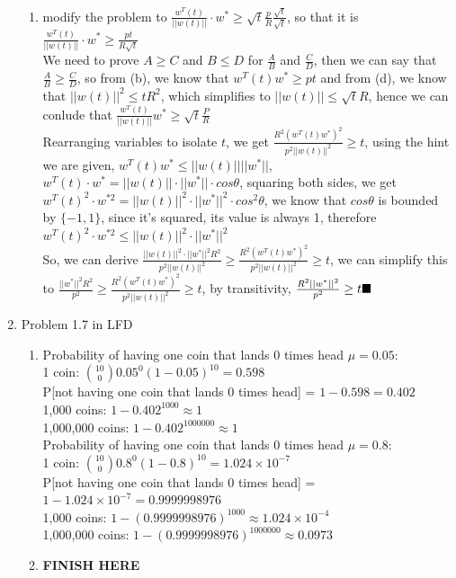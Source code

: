 \documentclass{article}
\begin{document}
\begin{enumerate}
\begin{enumerate}[label=(\alph*)]
            \item modify the problem to $\frac{w^T(t)}{||w(t)||} \cdot w^* \geq \sqrt{t} \frac{p}{R} \frac{\sqrt{t}}{\sqrt{t}}$, so that it is $\frac{w^T(t)}{||w(t)||} \cdot w^* \geq \frac{pt}{R\sqrt{t}}$ \\[0.25in]
            We need to prove $A \geq C$ and $B \leq D$ for $\frac{A}{B}$ and $\frac{C}{D}$, then we can say that $\frac{A}{B} \geq \frac{C}{D}$, so from (b), we know that $w^T(t)w^* \geq pt$ and from (d), we know that $||w(t)||^2 \leq tR^2$, which simplifies to $||w(t)|| \leq \sqrt{t}R$, hence we can conlude that $\frac{w^T(t)}{||w(t)||}w^* \geq \sqrt{t} \frac{P}{R}$\\[0.25in]
            Rearranging variables to isolate $t$, we get $\frac{R^2(w^T(t)w^*)^2}{p^2||w(t)||^2} \geq t$, using the hint we are given, $w^T(t)w^* \leq ||w(t)|| ||w^*||$, $w^T(t) \cdot w^* = ||w(t)|| \cdot ||w^*|| \cdot cos \theta$, squaring both sides, we get $w^T(t)^2 \cdot w^{*2} = ||w(t)||^2 \cdot ||w^*||^2 \cdot cos^2\theta$, we know that $cos\theta$ is bounded by $\{-1, 1\}$, since it's squared, its value is always 1, therefore $w^T(t)^2 \cdot w^{*2} \leq ||w(t)||^2 \cdot ||w^*||^2$\\[0.25in]
            So, we can derive $\frac{||w(t)||^2 \cdot ||w^*||^2 R^2}{p^2 ||w(t)||^2} \geq \frac{R^2(w^T(t)w^*)^2}{p^2||w(t)||^2} \geq t$, we can simplify this to $\frac{||w^*||^2R^2}{p^2} \geq \frac{R^2(w^T(t)w^*)^2}{p^2||w(t)||^2}\geq t$, by transitivity, $\frac{R^2||w^*||^2}{p^2}\geq t \hfill \blacksquare$
        \end{enumerate}

        \item Problem 1.7 in LFD
        \begin{enumerate}[label=(\alph*)]
            \item Probability of having one coin that lands 0 times head $\mu = 0.05$:\\
            1 coin: ${10 \choose 0}0.05^0(1-0.05)^{10} = 0.598$\\
            P[not having one coin that lands 0 times head] = $1 - 0.598 = 0.402$\\
            1,000 coins: $1 - 0.402^{1000} \approx 1$\\
            1,000,000 coins: $1 - 0.402^{1000000} \approx 1$\\[0.25in]
            Probability of having one coin that lands 0 times head $\mu = 0.8$:\\
            1 coin: ${10 \choose 0}0.8^0(1-0.8)^{10} = 1.024 \times 10^{-7}$\\
            P[not having one coin that lands 0 times head] = $1 - 1.024 \times 10^{-7} = 0.9999998976$\\
            1,000 coins: $1 - (0.9999998976)^{1000} \approx 1.024 \times 10^{-4}$\\
            1,000,000 coins: $1 - (0.9999998976)^{1000000} \approx 0.0973$
            \item \textbf{FINISH HERE}
        \end{enumerate}
    \end{enumerate}
\end{document}
